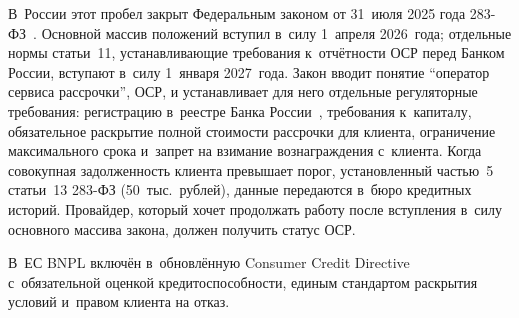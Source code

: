 В~России этот пробел закрыт Федеральным законом от 31~июля
2025 года 283-ФЗ~\cite{fz-283}. Основной массив положений
вступил в~силу 1~апреля 2026~года; отдельные нормы статьи~11,
устанавливающие требования к~отчётности ОСР перед Банком России,
вступают в~силу 1~января 2027~года.
Закон вводит понятие \enquote{оператор сервиса рассрочки}, ОСР,
и устанавливает для него отдельные регуляторные требования:
регистрацию в~реестре Банка России~\cite{cbr-osr}, требования
к~капиталу, обязательное раскрытие полной стоимости рассрочки
для клиента, ограничение максимального срока и~запрет на
взимание вознаграждения с~клиента. Когда совокупная задолженность
клиента превышает порог, установленный частью~5 статьи~13 283-ФЗ
(50~тыс.\ рублей), данные передаются в~бюро кредитных историй.
Провайдер, который хочет продолжать работу после вступления
в~силу основного массива закона, должен получить статус ОСР.

В~ЕС BNPL включён в~обновлённую Consumer Credit
Directive~\cite{eu-ccd-2023} с~обязательной оценкой
кредитоспособности, единым стандартом раскрытия условий
и~правом клиента на отказ.


